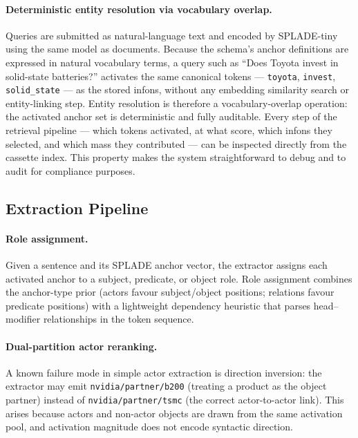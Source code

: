 \paragraph{Deterministic entity resolution via vocabulary overlap.}
Queries are submitted as natural-language text and encoded by SPLADE-tiny
using the same model as documents.  Because the schema's anchor definitions
are expressed in natural vocabulary terms, a query such as ``Does Toyota
invest in solid-state batteries?'' activates the same canonical tokens ---
\texttt{toyota}, \texttt{invest}, \texttt{solid\_state} --- as the stored
infons, without any embedding similarity search or entity-linking step.
Entity resolution is therefore a vocabulary-overlap operation: the activated
anchor set is deterministic and fully auditable.  Every step of the retrieval
pipeline --- which tokens activated, at what score, which infons they
selected, and which mass they contributed --- can be inspected directly from
the cassette index.  This property makes the system straightforward to debug
and to audit for compliance purposes.

\subsection{Extraction Pipeline}
\label{sec:implementation:extraction}

\paragraph{Role assignment.}
Given a sentence and its SPLADE anchor vector, the extractor assigns each
activated anchor to a subject, predicate, or object role.  Role assignment
combines the anchor-type prior (actors favour subject/object positions;
relations favour predicate positions) with a lightweight dependency heuristic
that parses head--modifier relationships in the token sequence.

\paragraph{Dual-partition actor reranking.}
A known failure mode in simple actor extraction is direction inversion: the
extractor may emit \texttt{nvidia/partner/b200} (treating a product as the
object partner) instead of \texttt{nvidia/partner/tsmc} (the correct
actor-to-actor link).  This arises because actors and non-actor objects are
drawn from the same activation pool, and activation magnitude does not encode
syntactic direction.

